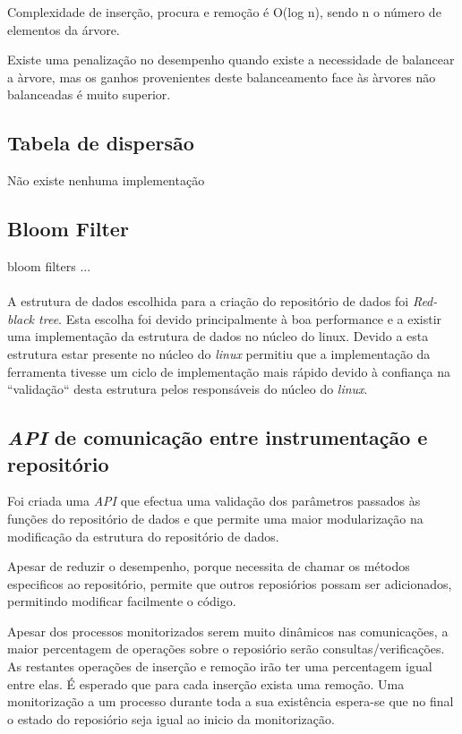 Complexidade de inserção, procura e remoção é O(log n), sendo n o número de elementos da árvore.

Existe uma penalização no desempenho quando existe a necessidade de balancear a àrvore, mas os ganhos provenientes deste balanceamento face às àrvores não balanceadas é muito superior.

\subsection{Tabela de dispersão}
Não existe nenhuma implementação 

\subsection{Bloom Filter}
bloom filters ...

\paragraph*{}
A estrutura de dados escolhida para a criação do repositório de dados foi \textit{Red-black tree}.
 Esta escolha foi devido principalmente à boa performance e a existir uma implementação da estrutura de dados no núcleo do linux.
 Devido a esta estrutura estar presente no núcleo do \textit{linux} permitiu que a implementação da ferramenta tivesse um ciclo de implementação mais rápido devido à confiança na ``validação`` desta estrutura pelos responsáveis do núcleo do \textit{linux}.

\subsection{\textit{API} de comunicação entre instrumentação e repositório}

 Foi criada uma \textit{API} que efectua uma validação dos parâmetros passados às funções do repositório de dados e que permite uma maior modularização na modificação da estrutura do repositório de dados.

Apesar de reduzir o desempenho, porque necessita de chamar os métodos especificos ao repositório, permite que outros reposiórios possam ser adicionados, permitindo modificar facilmente o código.

Apesar dos processos monitorizados serem muito dinâmicos nas comunicações, a maior percentagem de operações sobre o reposiório serão consultas/verificações.
 As restantes operações de inserção e remoção irão ter uma percentagem igual entre elas.
 É esperado que para cada inserção exista uma remoção.
 Uma monitorização a um processo durante toda a sua existência espera-se que no final o estado do reposiório seja igual ao inicio da monitorização.


